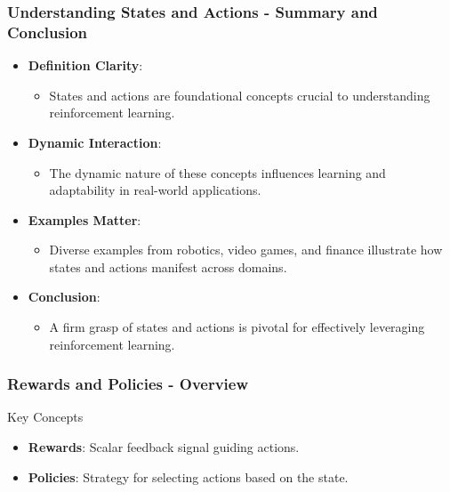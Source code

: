 \documentclass[aspectratio=169]{beamer}
\begin{document}
\begin{frame}[fragile]
    \frametitle{Understanding States and Actions - Summary and Conclusion}
    \begin{itemize}
        \item \textbf{Definition Clarity}:
        \begin{itemize}
            \item States and actions are foundational concepts crucial to understanding reinforcement learning.
        \end{itemize}

        \item \textbf{Dynamic Interaction}:
        \begin{itemize}
            \item The dynamic nature of these concepts influences learning and adaptability in real-world applications.
        \end{itemize}

        \item \textbf{Examples Matter}:
        \begin{itemize}
            \item Diverse examples from robotics, video games, and finance illustrate how states and actions manifest across domains.
        \end{itemize}

        \item \textbf{Conclusion}:
        \begin{itemize}
            \item A firm grasp of states and actions is pivotal for effectively leveraging reinforcement learning.
        \end{itemize}
    \end{itemize}
\end{frame}

\begin{frame}[fragile]
    \frametitle{Rewards and Policies - Overview}
    \begin{block}{Key Concepts}
        \begin{itemize}
            \item \textbf{Rewards}: Scalar feedback signal guiding actions.
            \item \textbf{Policies}: Strategy for selecting actions based on the state.
        \end{itemize}
    \end{block}
\end{frame}
\end{document}
